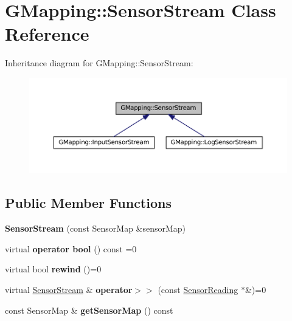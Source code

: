 \hypertarget{classGMapping_1_1SensorStream}{}\section{G\+Mapping\+:\+:Sensor\+Stream Class Reference}
\label{classGMapping_1_1SensorStream}


Inheritance diagram for G\+Mapping\+:\+:Sensor\+Stream\+:
\nopagebreak
\begin{figure}[H]
\begin{center}
\leavevmode
\includegraphics[width=350pt]{classGMapping_1_1SensorStream__inherit__graph}
\end{center}
\end{figure}
\subsection*{Public Member Functions}
\begin{DoxyCompactItemize}
\item 
\mbox{\label{classGMapping_1_1SensorStream_ae7a8b5c54cb9dffe20b7d5556a0c2e3d}} 
{\bfseries Sensor\+Stream} (const Sensor\+Map \&sensor\+Map)
\item 
\mbox{\label{classGMapping_1_1SensorStream_a4c9464c3a2ef72f386c669ec2a0cb849}} 
virtual {\bfseries operator bool} () const =0
\item 
\mbox{\label{classGMapping_1_1SensorStream_a683dee135ab1051f65d533b399854d99}} 
virtual bool {\bfseries rewind} ()=0
\item 
\mbox{\label{classGMapping_1_1SensorStream_a93830c09eaf4fef0765e0edb5d98a92f}} 
virtual \hyperlink{classGMapping_1_1SensorStream}{Sensor\+Stream} \& {\bfseries operator$>$$>$} (const \hyperlink{classGMapping_1_1SensorReading}{Sensor\+Reading} $\ast$\&)=0
\item 
\mbox{\label{classGMapping_1_1SensorStream_a676b9f4d8df96482a4882827a8a0a71f}} 
const Sensor\+Map \& {\bfseries get\+Sensor\+Map} () const
\end{DoxyCompactItemize}
